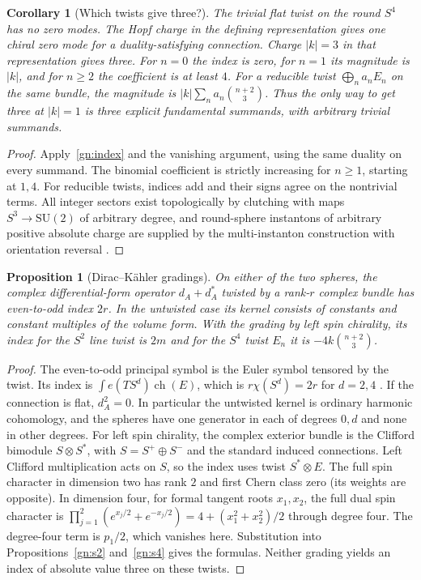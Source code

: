 \documentclass[aps,pra,onecolumn,superscriptaddress,nofootinbib,10pt]{revtex4-2}
\newtheorem{proposition}[theorem]{Proposition}
\newtheorem{corollary}[theorem]{Corollary}
\theoremstyle{definition}
\theoremstyle{remark}
\newcommand{\SU}{\mathrm{SU}}
\begin{document}
\begin{corollary}[Which twists give three?]\label{gn:sectors}
The trivial flat twist on the round $S^4$ has no zero modes. The
Hopf charge in the defining representation gives one chiral zero mode
for a duality-satisfying connection. Charge $|k|=3$ in that
representation gives three. For $n=0$ the index is zero, for $n=1$
its magnitude is $|k|$, and for $n\ge2$ the coefficient is at least
$4$. For a reducible twist $\bigoplus_n a_nE_n$ on the same bundle,
the magnitude is $|k|\sum_n a_n\binom{n+2}{3}$. Thus the only way
to get three at $|k|=1$ is three explicit fundamental summands,
with arbitrary trivial summands.
\end{corollary}
\begin{proof}
Apply~\eqref{gn:index} and the vanishing argument, using the same
duality on every summand. The binomial coefficient is strictly
increasing for $n\ge1$, starting at $1,4$. For reducible twists,
indices add and their signs agree on the nontrivial terms.
All integer sectors exist topologically by clutching with maps
$S^3\to\SU(2)$ of arbitrary degree, and round-sphere instantons
of arbitrary positive absolute charge are supplied by the
multi-instanton construction with orientation reversal
\cite{gn:JNR,gn:ADHM}.
\end{proof}

\begin{proposition}[Dirac--K\"ahler gradings]\label{gn:dk}
On either of the two spheres, the complex differential-form operator
$d_A+d_A^*$ twisted by a rank-$r$ complex bundle has even-to-odd index
$2r$. In the untwisted case its kernel consists of constants and
constant multiples of the volume form. With the grading by
\emph{left spin} chirality, its index for the $S^2$ line twist is $2m$
and for the $S^4$ twist $E_n$ it is $-4k\binom{n+2}{3}$.
\end{proposition}
\begin{proof}
The even-to-odd principal symbol is the Euler symbol tensored by the
twist. Its index is $\int e(TS^d)\operatorname{ch}(E)$, which is
$r\chi(S^d)=2r$ for $d=2,4$ \cite{gn:AS,cr:lawson}. If the
connection is flat, $d_A^2=0$. In particular the untwisted kernel is
ordinary harmonic cohomology, and the spheres have
one generator in each of degrees $0,d$ and none in other degrees.
For left spin chirality, the complex exterior bundle is the Clifford
bimodule $S\otimes S^*$, with $S=S^+\oplus S^-$ and the standard induced
connections. Left Clifford multiplication acts on $S$, so the index
uses twist $S^*\otimes E$. The full spin character in dimension two
has rank $2$ and first Chern class zero (its weights are opposite).
In dimension four, for formal tangent roots $x_1,x_2$, the full
dual spin character is
$\prod_{j=1}^2(e^{x_j/2}+e^{-x_j/2})=4+
(x_1^2+x_2^2)/2$ through degree four. The degree-four term is $p_1/2$,
which vanishes here. Substitution into Propositions~\ref{gn:s2}
and~\ref{gn:s4} gives the formulas. Neither grading yields an index
of absolute value three on these twists.
\end{proof}
\end{document}
